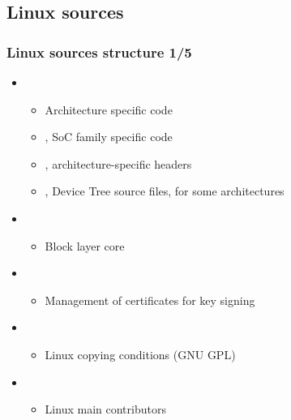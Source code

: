 \subsection{Linux sources}

\begin{frame}
  \frametitle{Linux sources structure 1/5}
  \begin{itemize}
  \item {}
    \begin{itemize}
    \item Architecture specific code
    \item {}, SoC family specific code
    \item {}, architecture-specific
      headers
    \item {}, Device Tree source files, for
      some architectures
    \end{itemize}
  \item {}
    \begin{itemize}
    \item Block layer core
    \end{itemize}
  \item {}
    \begin{itemize}
    \item Management of certificates for key signing
    \end{itemize}
  \item {}
    \begin{itemize}
    \item Linux copying conditions (GNU GPL)
    \end{itemize}
  \item {}
    \begin{itemize}
    \item Linux main contributors
    \end{itemize}
  \end{itemize}
\end{frame}

